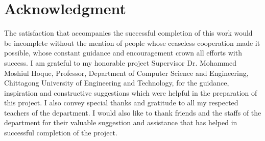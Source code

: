 \section{\hfil Acknowledgment \hfil}
\vspace{1cm}
The satisfaction that accompanies the successful completion of this work would be incomplete without the mention of people whose ceaseless cooperation made it possible, whose constant guidance and encouragement crown all efforts with success. I am grateful to my honorable project Supervisor Dr. Mohammed Moshiul Hoque, Professor, Department of Computer Science and Engineering, Chittagong University of Engineering and Technology, for the guidance, inspiration and constructive suggestions which were helpful in the preparation of this project. I also convey special thanks and gratitude to all my respected teachers of the department. I would also like to thank friends and the staffs of the department for their valuable suggestion and assistance that has helped in successful completion of the project.
\clearpage